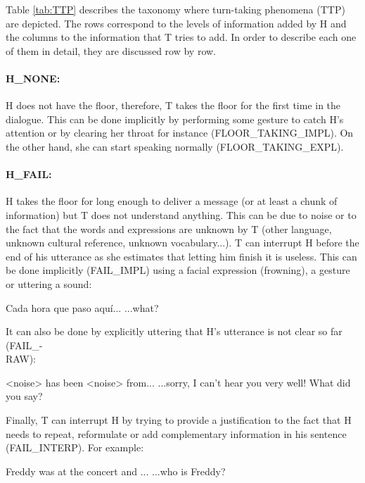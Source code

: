         Table \ref{tab:TTP} describes the taxonomy where turn-taking phenomena (TTP) are depicted. The rows correspond to the levels of information added by H and the columns to the information that T tries to add. In order to describe each one of them in detail, they are discussed row by row.
        
        \paragraph{H\_NONE:} H does not have the floor, therefore, T takes the floor for the first time in the dialogue. This can be done implicitly by performing some gesture to catch H's attention or by clearing her throat for instance (FLOOR\_TAKING\_IMPL). On the other hand, she can start speaking normally (FLOOR\_TAKING\_EXPL).
        
        \paragraph{H\_FAIL:} H takes the floor for long enough to deliver a message (or at least a chunk of information) but T does not understand anything. This can be due to noise or to the fact that the words and expressions are unknown by T (other language, unknown cultural reference, unknown vocabulary...). T can interrupt H before the end of his utterance as she estimates that letting him finish it is useless. This can be done implicitly (FAIL\_IMPL) using a facial expression (frowning), a gesture or uttering a sound:
				
					\begin{dialogue}
						 Cada hora que paso aqu\'i...
						 ...what?
					\end{dialogue}
					
					It can also be done by explicitly uttering that H's utterance is not clear so far (FAIL\_-\\RAW):
					
					\begin{dialogue}
						 <noise> has been <noise> from...
						 ...sorry, I can't hear you very well! What did you say?
					\end{dialogue}
					
					Finally, T can interrupt H by trying to provide a justification to the fact that H needs to repeat, reformulate or add complementary information in his sentence (FAIL\_INTERP). For example:
					
					\begin{dialogue}
						 Freddy was at the concert and ...
						 ...who is Freddy?
					\end{dialogue}
					
